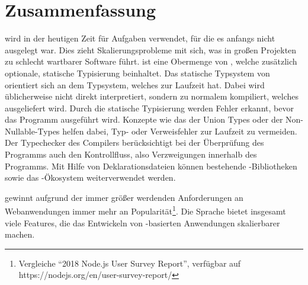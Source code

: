 \documentclass[a4paper]{scrartcl}
\begin{document}
\section{Zusammenfassung}
\js{} wird in der heutigen Zeit für Aufgaben verwendet, für die es anfangs nicht ausgelegt war.
Dies zieht Skalierungsprobleme mit sich, was in großen Projekten zu schlecht wartbarer Software führt.
\ts{} ist eine Obermenge von \js{}, welche zusätzlich optionale, statische Typisierung beinhaltet.
Das statische Typsystem von \ts{} orientiert sich an dem Typsystem, welches \js{} zur Laufzeit hat.
Dabei wird \ts{} üblicherweise nicht direkt interpretiert, sondern zu normalem \js{} kompiliert, welches ausgeliefert wird.
Durch die statische Typisierung werden Fehler erkannt, bevor das Programm ausgeführt wird.
Konzepte wie das der Union Types oder der Non-Nullable-Types helfen dabei, Typ- oder Verweisfehler zur Laufzeit zu vermeiden.
Der Typechecker des Compilers berücksichtigt bei der Überprüfung des Programms auch den Kontrollfluss, also Verzweigungen innerhalb des Programms.
Mit Hilfe von Deklarationsdateien können bestehende \js-Bibliotheken sowie das \js-Ökosystem weiterverwendet werden.

\ts{} gewinnt aufgrund der immer größer werdenden Anforderungen an Webanwendungen immer mehr an Popularität\footnote{Vergleiche \enquote{2018 Node.js User Survey Report}, verfügbar auf https://nodejs.org/en/user-survey-report/}.
Die Sprache bietet insgesamt viele Features, die das Entwickeln von \js-basierten Anwendungen skalierbarer machen.



\end{document}
